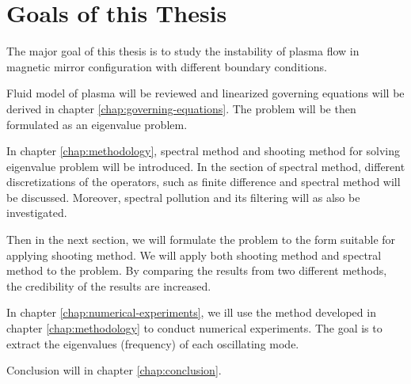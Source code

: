 \section{Goals of this Thesis}
The major goal of this thesis is to study the instability of plasma flow in magnetic mirror configuration with different boundary conditions.

Fluid model of plasma will be reviewed and linearized governing equations will be derived in chapter \ref{chap:governing-equations}. The problem will be then formulated as an eigenvalue problem.

In chapter \ref{chap:methodology}, spectral method and shooting method for solving eigenvalue problem will be introduced. 
In the section of spectral method, different discretizations of the operators, such as finite difference and spectral method will be discussed.
Moreover, spectral pollution and its filtering will as also be investigated.

Then in the next section, we will formulate the problem to the form suitable for applying shooting method. We will apply both shooting method and spectral method to the problem.
By comparing the results from two different methods, the credibility of the results are increased.

In chapter \ref{chap:numerical-experiments}, we ill use the method developed in chapter \ref{chap:methodology} to conduct numerical experiments. The goal is to extract the eigenvalues (frequency) of each oscillating mode. 

Conclusion will in chapter \ref{chap:conclusion}.